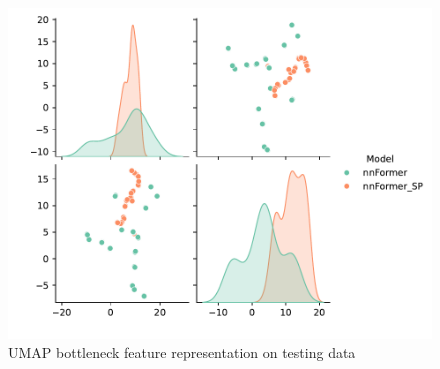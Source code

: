 \begin{figure}[htb!] %
\centering
\centering
\includegraphics[width=1\textwidth]{images/Umap_test.pdf}
\caption{\centering UMAP bottleneck feature representation on testing data}
\label{Fig:umap test}
\end{figure}

